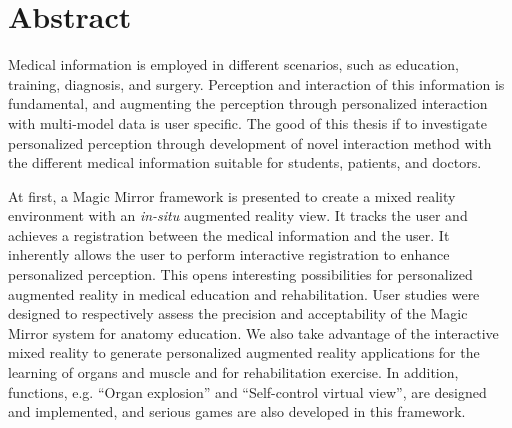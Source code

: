 %
\chapter*{Abstract}
\label{sec:abstract}
Medical information is employed in different scenarios, such as education, training, diagnosis, and surgery.
Perception and interaction of this information is fundamental, and augmenting the perception through personalized interaction with multi-model data is user specific.
The good of this thesis if to investigate personalized perception through development of novel interaction method with the different medical information suitable for students, patients, and doctors.

At first, a Magic Mirror framework is presented to create a mixed reality environment with an \textit{in-situ} augmented reality view. 
{It tracks the user and achieves a registration between the medical information and the user.}
It inherently allows the user to perform interactive registration to enhance personalized perception. This opens interesting possibilities for personalized augmented reality in medical education and rehabilitation. User studies were designed to respectively assess the precision and acceptability of the Magic Mirror system for anatomy education. 
{We also take advantage of the interactive mixed reality to generate personalized augmented reality applications for the learning of organs and muscle and for rehabilitation exercise.} In addition, functions, e.g. ``Organ explosion'' and ``Self-control virtual view'', are designed and implemented, and serious games are also developed in this framework.

